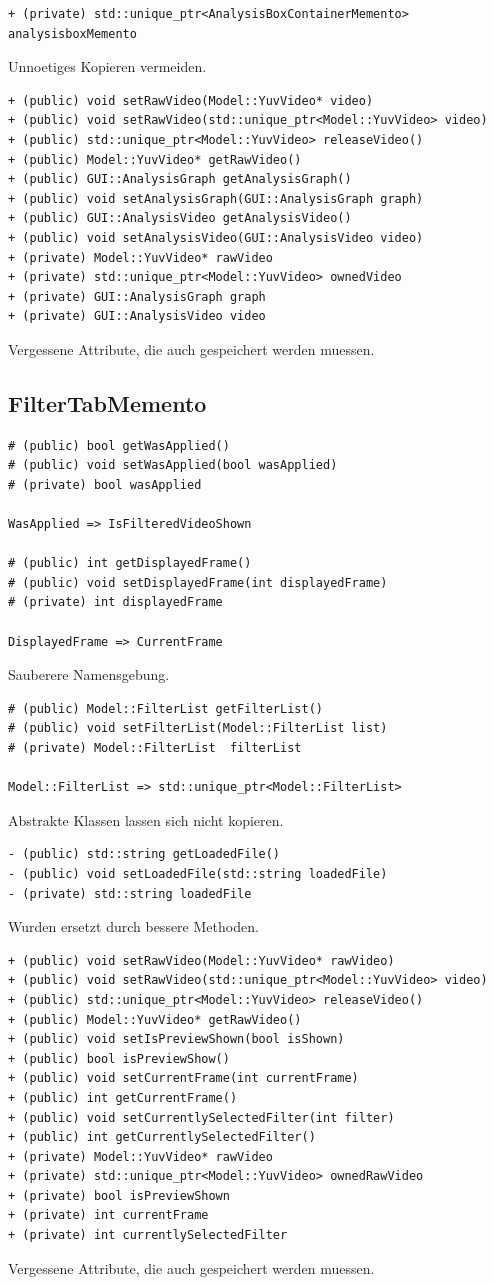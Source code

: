 \documentclass{scrartcl}
\begin{document}
{\begin{verbatim}
+ (private) std::unique_ptr<AnalysisBoxContainerMemento> analysisboxMemento
\end{verbatim}
Unnoetiges Kopieren vermeiden.
\begin{verbatim}
+ (public) void setRawVideo(Model::YuvVideo* video)
+ (public) void setRawVideo(std::unique_ptr<Model::YuvVideo> video)
+ (public) std::unique_ptr<Model::YuvVideo> releaseVideo()
+ (public) Model::YuvVideo* getRawVideo()
+ (public) GUI::AnalysisGraph getAnalysisGraph()
+ (public) void setAnalysisGraph(GUI::AnalysisGraph graph)
+ (public) GUI::AnalysisVideo getAnalysisVideo()
+ (public) void setAnalysisVideo(GUI::AnalysisVideo video)
+ (private) Model::YuvVideo* rawVideo
+ (private) std::unique_ptr<Model::YuvVideo> ownedVideo
+ (private) GUI::AnalysisGraph graph
+ (private) GUI::AnalysisVideo video
\end{verbatim}
Vergessene Attribute, die auch gespeichert werden muessen.
\subsection{FilterTabMemento}
\begin{verbatim}
# (public) bool getWasApplied()
# (public) void setWasApplied(bool wasApplied)
# (private) bool wasApplied

WasApplied => IsFilteredVideoShown

# (public) int getDisplayedFrame()
# (public) void setDisplayedFrame(int displayedFrame)
# (private) int displayedFrame

DisplayedFrame => CurrentFrame

\end{verbatim}
Sauberere Namensgebung.
\begin{verbatim}
# (public) Model::FilterList getFilterList()
# (public) void setFilterList(Model::FilterList list)
# (private) Model::FilterList  filterList

Model::FilterList => std::unique_ptr<Model::FilterList>
\end{verbatim}
Abstrakte Klassen lassen sich nicht kopieren.
\begin{verbatim}
- (public) std::string getLoadedFile()
- (public) void setLoadedFile(std::string loadedFile)
- (private) std::string loadedFile
\end{verbatim}
Wurden ersetzt durch bessere Methoden.
\begin{verbatim}
+ (public) void setRawVideo(Model::YuvVideo* rawVideo)
+ (public) void setRawVideo(std::unique_ptr<Model::YuvVideo> video)
+ (public) std::unique_ptr<Model::YuvVideo> releaseVideo()
+ (public) Model::YuvVideo* getRawVideo()
+ (public) void setIsPreviewShown(bool isShown)
+ (public) bool isPreviewShow()
+ (public) void setCurrentFrame(int currentFrame)
+ (public) int getCurrentFrame()
+ (public) void setCurrentlySelectedFilter(int filter)
+ (public) int getCurrentlySelectedFilter()
+ (private) Model::YuvVideo* rawVideo
+ (private) std::unique_ptr<Model::YuvVideo> ownedRawVideo
+ (private) bool isPreviewShown
+ (private) int currentFrame
+ (private) int currentlySelectedFilter
\end{verbatim}
Vergessene Attribute, die auch gespeichert werden muessen.
}
\end{document}
